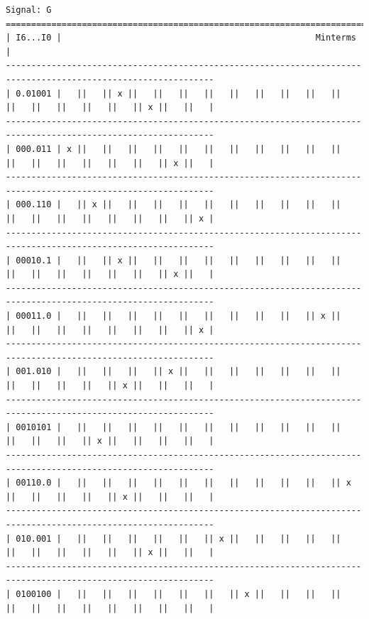 \documentclass{article}
\begin{document}
\begin{enumerate}
            \pagebreak
            \begin{scriptsize}
                \begin{verbatim}
Signal: G
===============================================================================================================
| I6...I0 |                                                  Minterms                                        |
---------------------------------------------------------------------------------------------------------------
| 0.01001 |   ||   || x ||   ||   ||   ||   ||   ||   ||   ||   ||   ||   ||   ||   ||   ||   || x ||   ||   |
---------------------------------------------------------------------------------------------------------------
| 000.011 | x ||   ||   ||   ||   ||   ||   ||   ||   ||   ||   ||   ||   ||   ||   ||   ||   ||   || x ||   |
---------------------------------------------------------------------------------------------------------------
| 000.110 |   || x ||   ||   ||   ||   ||   ||   ||   ||   ||   ||   ||   ||   ||   ||   ||   ||   ||   || x |
---------------------------------------------------------------------------------------------------------------
| 00010.1 |   ||   || x ||   ||   ||   ||   ||   ||   ||   ||   ||   ||   ||   ||   ||   ||   ||   || x ||   |
---------------------------------------------------------------------------------------------------------------
| 00011.0 |   ||   ||   ||   ||   ||   ||   ||   ||   ||   || x ||   ||   ||   ||   ||   ||   ||   ||   || x |
---------------------------------------------------------------------------------------------------------------
| 001.010 |   ||   ||   ||   || x ||   ||   ||   ||   ||   ||   ||   ||   ||   ||   ||   || x ||   ||   ||   |
---------------------------------------------------------------------------------------------------------------
| 0010101 |   ||   ||   ||   ||   ||   ||   ||   ||   ||   ||   ||   ||   ||   ||   || x ||   ||   ||   ||   |
---------------------------------------------------------------------------------------------------------------
| 00110.0 |   ||   ||   ||   ||   ||   ||   ||   ||   ||   ||   || x ||   ||   ||   ||   || x ||   ||   ||   |
---------------------------------------------------------------------------------------------------------------
| 010.001 |   ||   ||   ||   ||   ||   || x ||   ||   ||   ||   ||   ||   ||   ||   ||   ||   || x ||   ||   |
---------------------------------------------------------------------------------------------------------------
| 0100100 |   ||   ||   ||   ||   ||   ||   || x ||   ||   ||   ||   ||   ||   ||   ||   ||   ||   ||   ||   |

\end{verbatim}
\end{scriptsize}
\end{enumerate}
\end{document}
